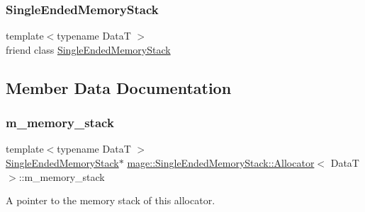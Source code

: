 \subsubsection{\texorpdfstring{Single\+Ended\+Memory\+Stack}{SingleEndedMemoryStack}}
{\footnotesize\ttfamily template$<$typename DataT $>$ \\
friend class \hyperlink{classmage_1_1_single_ended_memory_stack}{Single\+Ended\+Memory\+Stack}\hspace{0.3cm}{\ttfamily [friend]}}



\subsection{Member Data Documentation}
\hypertarget{structmage_1_1_single_ended_memory_stack_1_1_allocator_ac5d79f87385234430d25cdf004255d70}{}\label{structmage_1_1_single_ended_memory_stack_1_1_allocator_ac5d79f87385234430d25cdf004255d70} 
\subsubsection{\texorpdfstring{m\+\_\+memory\+\_\+stack}{m\_memory\_stack}}
{\footnotesize\ttfamily template$<$typename DataT $>$ \\
\hyperlink{classmage_1_1_single_ended_memory_stack}{Single\+Ended\+Memory\+Stack}$\ast$ \hyperlink{structmage_1_1_single_ended_memory_stack_1_1_allocator}{mage\+::\+Single\+Ended\+Memory\+Stack\+::\+Allocator}$<$ DataT $>$\+::m\+\_\+memory\+\_\+stack\hspace{0.3cm}{\ttfamily [private]}}

A pointer to the memory stack of this allocator. 
